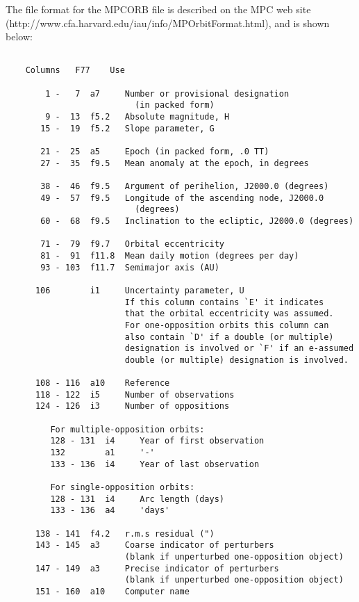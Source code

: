 The file format for the MPCORB file is described on the MPC web site
(http://www.cfa.harvard.edu/iau/info/MPOrbitFormat.html), and is
shown below:

\begin{verbatim}

    Columns   F77    Use

        1 -   7  a7     Number or provisional designation
                          (in packed form)
        9 -  13  f5.2   Absolute magnitude, H
       15 -  19  f5.2   Slope parameter, G

       21 -  25  a5     Epoch (in packed form, .0 TT)
       27 -  35  f9.5   Mean anomaly at the epoch, in degrees

       38 -  46  f9.5   Argument of perihelion, J2000.0 (degrees)
       49 -  57  f9.5   Longitude of the ascending node, J2000.0
                          (degrees)
       60 -  68  f9.5   Inclination to the ecliptic, J2000.0 (degrees)

       71 -  79  f9.7   Orbital eccentricity
       81 -  91  f11.8  Mean daily motion (degrees per day)
       93 - 103  f11.7  Semimajor axis (AU)

      106        i1     Uncertainty parameter, U
                        If this column contains `E' it indicates
                        that the orbital eccentricity was assumed.
                        For one-opposition orbits this column can
                        also contain `D' if a double (or multiple)
                        designation is involved or `F' if an e-assumed
                        double (or multiple) designation is involved.

      108 - 116  a10    Reference
      118 - 122  i5     Number of observations
      124 - 126  i3     Number of oppositions

         For multiple-opposition orbits:
         128 - 131  i4     Year of first observation
         132        a1     '-'
         133 - 136  i4     Year of last observation

         For single-opposition orbits:
         128 - 131  i4     Arc length (days)
         133 - 136  a4     'days'

      138 - 141  f4.2   r.m.s residual (")
      143 - 145  a3     Coarse indicator of perturbers
                        (blank if unperturbed one-opposition object)
      147 - 149  a3     Precise indicator of perturbers
                        (blank if unperturbed one-opposition object)
      151 - 160  a10    Computer name


\end{verbatim}
